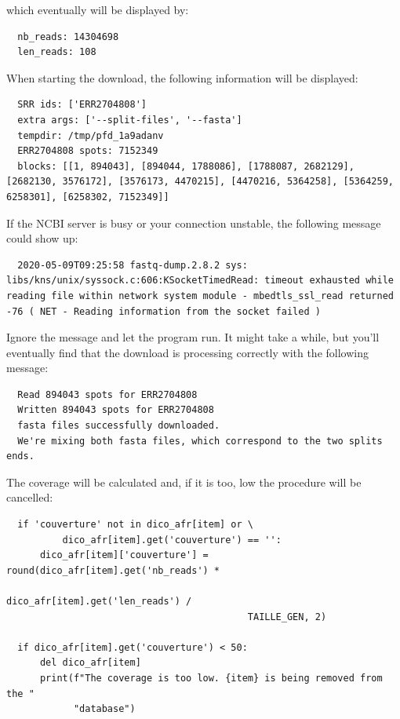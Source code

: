 \documentclass[twoside,a4paper,11pt,frenchb,openany]{report}
\begin{document}
    which eventually will be displayed by:

    \begin{verbatim}
  nb_reads: 14304698
  len_reads: 108
\end{verbatim}

    When starting the download, the following information will be displayed:

    \begin{verbatim}
  SRR ids: ['ERR2704808']
  extra args: ['--split-files', '--fasta']
  tempdir: /tmp/pfd_1a9adanv
  ERR2704808 spots: 7152349
  blocks: [[1, 894043], [894044, 1788086], [1788087, 2682129], [2682130, 3576172], [3576173, 4470215], [4470216, 5364258], [5364259, 6258301], [6258302, 7152349]]
\end{verbatim}

    If the NCBI server is busy or your connection unstable, the following
message could show up:

    \begin{verbatim}
  2020-05-09T09:25:58 fastq-dump.2.8.2 sys: libs/kns/unix/syssock.c:606:KSocketTimedRead: timeout exhausted while reading file within network system module - mbedtls_ssl_read returned -76 ( NET - Reading information from the socket failed )
\end{verbatim}

    Ignore the message and let the program run. It might take a while, but
you'll eventually find that the download is processing correctly with
the following message:

    \begin{verbatim}
  Read 894043 spots for ERR2704808
  Written 894043 spots for ERR2704808
  fasta files successfully downloaded.
  We're mixing both fasta files, which correspond to the two splits ends.
\end{verbatim}

    The coverage will be calculated and, if it is too, low the procedure
will be cancelled:

 \begin{verbatim}
  if 'couverture' not in dico_afr[item] or \
          dico_afr[item].get('couverture') == '':
      dico_afr[item]['couverture'] = round(dico_afr[item].get('nb_reads') *
                                           dico_afr[item].get('len_reads') /
                                           TAILLE_GEN, 2)
        
  if dico_afr[item].get('couverture') < 50:
      del dico_afr[item]
      print(f"The coverage is too low. {item} is being removed from the "
            "database")
\end{verbatim}
\end{document}
